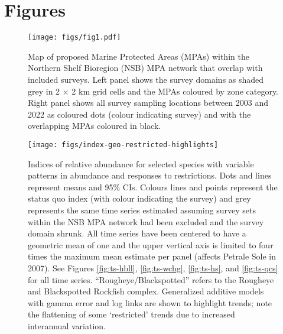 \documentclass[12pt]{article}
\begin{document}



\clearpage



\section*{Figures}

\begin{figure}[htb]
  \centering
  \texttt{[image: figs/fig1.pdf]}
  \caption{Map of proposed Marine Protected Areas (MPAs) within the Northern Shelf Bioregion (NSB) MPA network that overlap with included surveys. Left panel shows the survey domains as shaded grey in 2 $\times$ 2 km grid cells and the MPAs coloured by zone category. Right panel shows all survey sampling locations between 2003 and 2022 as coloured dots (colour indicating survey) and with the overlapping MPAs coloured in black.}
  \label{fig:map}
\end{figure}



\begin{figure}[htb]
    \centering
    \texttt{[image: figs/index-geo-restricted-highlights]}
    \caption{Indices of relative abundance for selected species with variable patterns in abundance and responses to restrictions. Dots and lines represent means and 95\% CIs. Colours lines and points represent the status quo index (with colour indicating the survey) and grey represents the same time series estimated assuming survey sets within the NSB MPA network had been excluded and the survey domain shrunk. All time series have been centered to have a geometric mean of one and the upper vertical axis is limited to four times the maximum mean estimate per panel (affects Petrale Sole in 2007). See Figures \ref{fig:ts-hbll}, \ref{fig:ts-wchg}, \ref{fig:ts-hs}, and \ref{fig:ts-qcs} for all time series. ``Rougheye/Blackspotted'' refers to the Rougheye and Blackspotted Rockfish complex. Generalized additive models with gamma error and log links are shown to highlight trends; note the flattening of some `restricted' trends due to increased interannual variation.}
    \label{fig:timeseries}
\end{figure}
\end{document}
